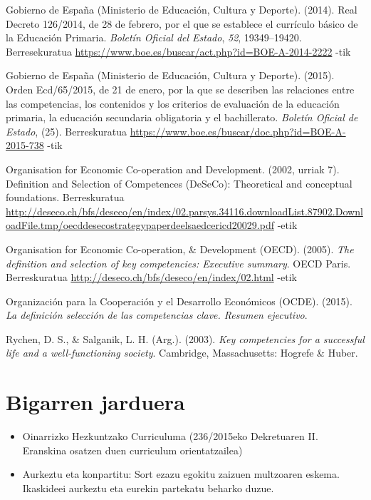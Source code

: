 \documentclass[]{book}
\begin{document}
Gobierno de España (Ministerio de Educación, Cultura y Deporte). (2014). Real Decreto 126/2014, de 28 de febrero, por el que se establece el currículo básico de la Educación Primaria. \emph{Boletín Oficial del Estado}, \emph{52}, 19349--19420. Berresekuratua \url{https://www.boe.es/buscar/act.php?id=BOE-A-2014-2222} -tik

Gobierno de España (Ministerio de Educación, Cultura y Deporte). (2015). Orden Ecd/65/2015, de 21 de enero, por la que se describen las relaciones entre las competencias, los contenidos y los criterios de evaluación de la educación primaria, la educación secundaria obligatoria y el bachillerato. \emph{Boletín Oficial de Estado}, (25). Berreskuratua \url{https://www.boe.es/buscar/doc.php?id=BOE-A-2015-738} -tik

Organisation for Economic Co-operation and Development. (2002, urriak 7). Definition and Selection of Competences (DeSeCo): Theoretical and conceptual foundations. Berreskuratua \url{http://deseco.ch/bfs/deseco/en/index/02.parsys.34116.downloadList.87902.DownloadFile.tmp/oecddesecostrategypaperdeelsaedcericd20029.pdf} -etik

Organisation for Economic Co-operation, \& Development (OECD). (2005). \emph{The definition and selection of key competencies: Executive summary}. OECD Paris. Berreskuratua \url{http://deseco.ch/bfs/deseco/en/index/02.html} -etik

Organización para la Cooperación y el Desarrollo Económicos (OCDE). (2015). \emph{La definición selección de las competencias clave. Resumen ejecutivo}.

Rychen, D. S., \& Salganik, L. H. (Arg.). (2003). \emph{Key competencies for a successful life and a well-functioning society}. Cambridge, Massachusetts: Hogrefe \& Huber.

\hypertarget{bigarren-jarduera}{%
\chapter*{Bigarren jarduera}\label{bigarren-jarduera}}

\begin{itemize}
\item
  Oinarrizko Hezkuntzako Curriculuma
  (236/2015eko Dekretuaren II. Eranskina osatzen duen curriculum orientatzailea)
\item
  Aurkeztu eta konpartitu:
  Sort ezazu egokitu zaizuen multzoaren eskema. Ikaskideei aurkeztu eta eurekin partekatu beharko duzue.
\end{itemize}
\end{document}
